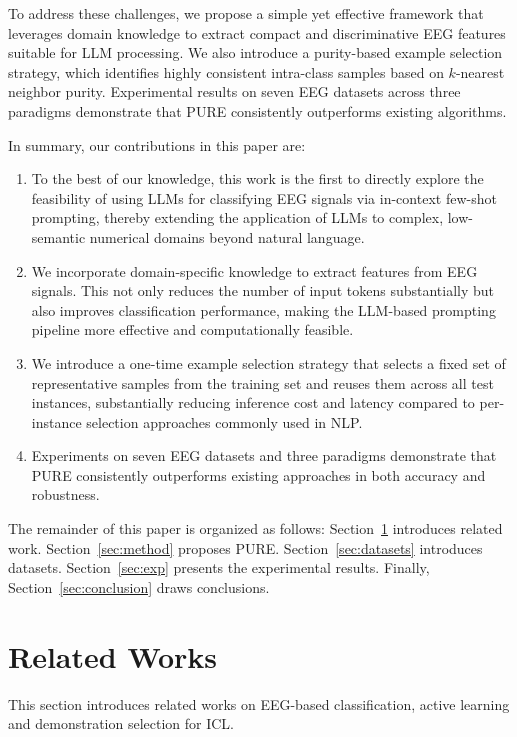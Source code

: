 \documentclass[journal,twocolumn]{IEEEtran}
\begin{document}
To address these challenges, we propose a simple yet effective framework that leverages domain knowledge to extract compact and discriminative EEG features suitable for LLM processing. We also introduce a purity-based example selection strategy, which identifies highly consistent intra-class samples based on $k$-nearest neighbor purity. Experimental results on seven EEG datasets across three paradigms demonstrate that PURE consistently outperforms existing algorithms.

In summary, our contributions in this paper are:
\begin{enumerate}
\item To the best of our knowledge, this work is the first to directly explore the feasibility of using LLMs for classifying EEG signals via in-context few-shot prompting, thereby extending the application of LLMs to complex, low-semantic numerical domains beyond natural language.
\item We incorporate domain-specific knowledge to extract features from EEG signals. This not only reduces the number of input tokens substantially but also improves classification performance, making the LLM-based prompting pipeline more effective and computationally feasible.
\item We introduce a one-time example selection strategy that selects a fixed set of representative samples from the training set and reuses them across all test instances, substantially reducing inference cost and latency compared to per-instance selection approaches commonly used in NLP.
\item Experiments on seven EEG datasets and three paradigms demonstrate that PURE consistently outperforms existing approaches in both accuracy and robustness.
\end{enumerate}

The remainder of this paper is organized as follows: Section~\ref{sec:related} introduces related work. Section~\ref{sec:method} proposes PURE. Section~\ref{sec:datasets} introduces datasets. Section~\ref{sec:exp} presents the experimental results. Finally, Section~\ref{sec:conclusion} draws conclusions.


\section{Related Works}
\label{sec:related}

This section introduces related works on EEG-based classification, active learning and demonstration selection for ICL.
 
\end{document}
